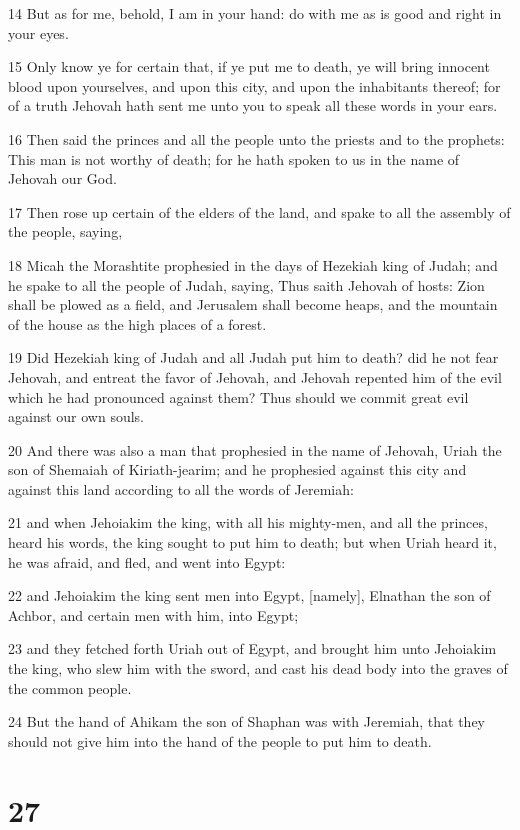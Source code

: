 \par 14 But as for me, behold, I am in your hand: do with me as is good and right in your eyes.
\par 15 Only know ye for certain that, if ye put me to death, ye will bring innocent blood upon yourselves, and upon this city, and upon the inhabitants thereof; for of a truth Jehovah hath sent me unto you to speak all these words in your ears.
\par 16 Then said the princes and all the people unto the priests and to the prophets: This man is not worthy of death; for he hath spoken to us in the name of Jehovah our God.
\par 17 Then rose up certain of the elders of the land, and spake to all the assembly of the people, saying,
\par 18 Micah the Morashtite prophesied in the days of Hezekiah king of Judah; and he spake to all the people of Judah, saying, Thus saith Jehovah of hosts: Zion shall be plowed as a field, and Jerusalem shall become heaps, and the mountain of the house as the high places of a forest.
\par 19 Did Hezekiah king of Judah and all Judah put him to death? did he not fear Jehovah, and entreat the favor of Jehovah, and Jehovah repented him of the evil which he had pronounced against them? Thus should we commit great evil against our own souls.
\par 20 And there was also a man that prophesied in the name of Jehovah, Uriah the son of Shemaiah of Kiriath-jearim; and he prophesied against this city and against this land according to all the words of Jeremiah:
\par 21 and when Jehoiakim the king, with all his mighty-men, and all the princes, heard his words, the king sought to put him to death; but when Uriah heard it, he was afraid, and fled, and went into Egypt:
\par 22 and Jehoiakim the king sent men into Egypt, [namely], Elnathan the son of Achbor, and certain men with him, into Egypt;
\par 23 and they fetched forth Uriah out of Egypt, and brought him unto Jehoiakim the king, who slew him with the sword, and cast his dead body into the graves of the common people.
\par 24 But the hand of Ahikam the son of Shaphan was with Jeremiah, that they should not give him into the hand of the people to put him to death.

\chapter{27}

